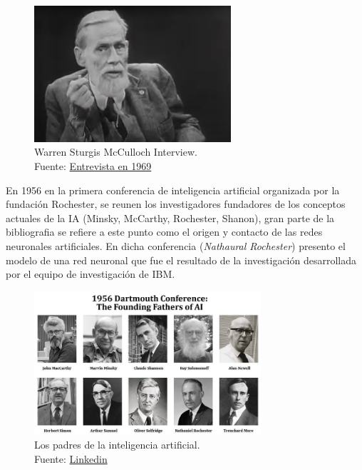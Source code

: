 \begin{figure}[H]
  \centering
  \includegraphics[width=0.65\textwidth]{figures/Warren Sturgis McCulloch Interview.png}
  \caption{Warren Sturgis McCulloch Interview. \\Fuente: \href{https://www.youtube.com/watch?v=8Wdz1Tj5084}{Entrevista en 1969}}
  \label{fig:Warren Sturgis McCulloch}
\end{figure}


En 1956 en la primera conferencia de inteligencia artificial organizada por la fundación {Rochester}, se reunen los investigadores fundadores de los conceptos actuales de la IA ({Minsky, McCarthy, Rochester, Shanon}), gran parte de la bibliografia se refiere a este punto como el origen y contacto de las redes neuronales artificiales.
En dicha conferencia (\textit{Nathaural Rochester}) presento el modelo de una red neuronal que fue el resultado de la investigación desarrollada por el equipo de investigación de IBM.

\begin{figure}[H]
  \centering
  \includegraphics[width=0.75\textwidth]{figures/conferecia 1956 - 1689170718524.png}
  \caption{Los padres de la inteligencia artificial. \\Fuente: \href{https://www.linkedin.com/pulse/first-ever-ai-conference-tracing-evolution-history-ofai-nicky-verd}{Linkedin}}
  \label{fig:conferencia-1956}
\end{figure}

